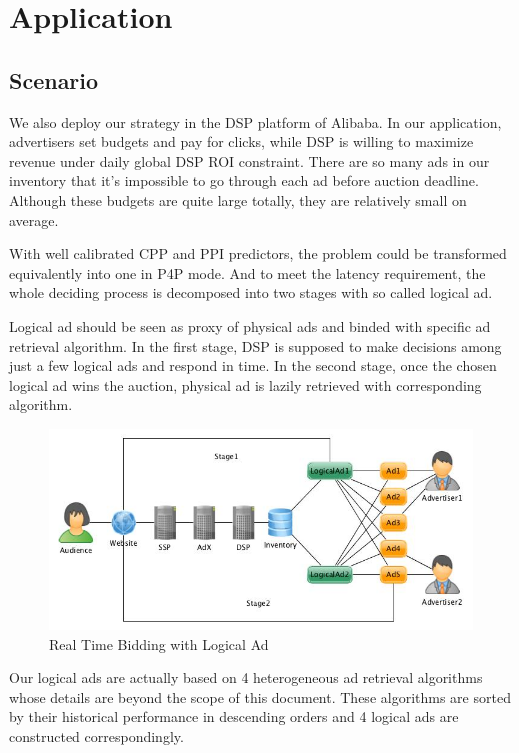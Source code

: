 \documentclass{article}
\begin{document}
\section{Application} \label{Application}

\subsection{Scenario}

We also deploy our strategy in the DSP platform of Alibaba.
In our application, advertisers set budgets and pay for clicks, while DSP is willing to maximize revenue under daily global DSP ROI constraint.
There are so many ads in our inventory that it's impossible to go through each ad before auction deadline.
Although these budgets are quite large totally, they are relatively small on average.

With well calibrated CPP and PPI predictors, the problem could be transformed equivalently into one in P4P mode.
And to meet the latency requirement, the whole deciding process is decomposed into two stages with so called logical ad.

Logical ad should be seen as proxy of physical ads and binded with specific ad retrieval algorithm.
In the first stage, DSP is supposed to make decisions among just a few logical ads and respond in time.
In the second stage, once the chosen logical ad wins the auction, physical ad is lazily retrieved with corresponding algorithm.

\begin{figure}[!h]
\centering
\includegraphics[width=1.0\linewidth]{./LogicalAd.jpg}
\caption{Real Time Bidding with Logical Ad}
\end{figure}

Our logical ads are actually based on 4 heterogeneous ad retrieval algorithms whose details are beyond the scope of this document.
These algorithms are sorted by their historical performance in descending orders and 4 logical ads are constructed correspondingly.
\end{document}
